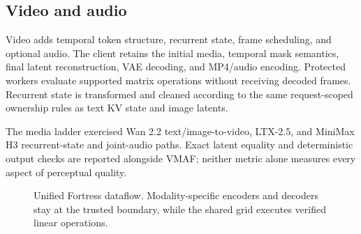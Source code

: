 \subsection{Video and audio}

Video adds temporal token structure, recurrent state, frame scheduling, and optional audio. The client retains the initial media, temporal mask semantics, final latent reconstruction, VAE decoding, and MP4/audio encoding. Protected workers evaluate supported matrix operations without receiving decoded frames. Recurrent state is transformed and cleaned according to the same request-scoped ownership rules as text KV state and image latents.

The media ladder exercised Wan 2.2 text/image-to-video, LTX-2.5, and MiniMax H3 recurrent-state and joint-audio paths. Exact latent equality and deterministic output checks are reported alongside VMAF; neither metric alone measures every aspect of perceptual quality.

\begin{figure}[htbp]
\centering

\caption{Unified Fortress dataflow. Modality-specific encoders and decoders stay at the trusted boundary, while the shared grid executes verified linear operations.}
\label{fig:multimodal}
\end{figure}
